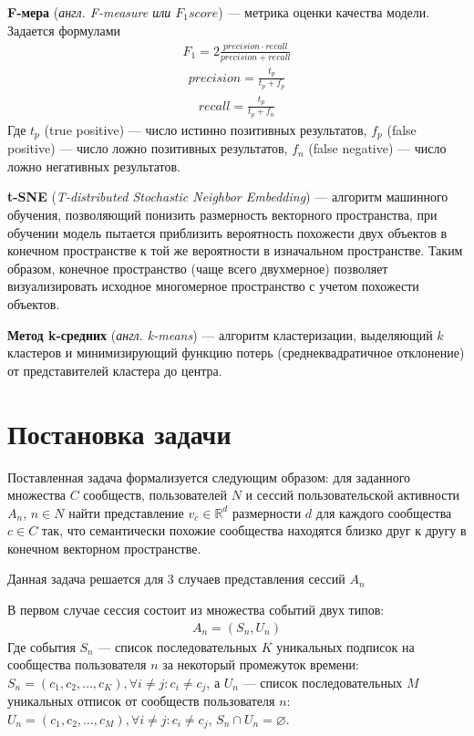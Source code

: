 \documentclass[times,specification,annotation]{itmo-student-thesis}
\begin{document}
\textbf{F-мера} (\textit{англ. F-measure или $F_1 score$}) --- метрика оценки качества модели. Задается формулами
 \begin{align*}
F_1 = 2 \frac{precision \cdot recall}{precision + recall}
\end{align*}
 \begin{align*}
precision = \frac{t_p}{t_p + f_p}
\end{align*}
 \begin{align*}
recall = \frac{t_p}{t_p + f_n}
\end{align*}
Где $t_p$ (true positive) --- число истинно позитивных результатов, $f_p$ (false positive) --- число ложно позитивных результатов, $f_n$ (false negative) --- число ложно негативных результатов.



\textbf{t-SNE} (\textit{T-distributed Stochastic Neighbor Embedding})\cite{maaten2008visualizing} --- алгоритм машинного обучения, позволяющий понизить размерность векторного пространства, при обучении модель пытается приблизить вероятность похожести двух объектов в конечном пространстве к той же вероятности в изначальном пространстве. Таким образом, конечное пространство (чаще всего двухмерное) позволяет визуализировать исходное многомерное пространство с учетом похожести объектов. 

\textbf{Метод k-средних} (\textit{англ. k-means})\cite{lloyd1982least} --- алгоритм кластеризации, выделяющий $k$ кластеров и минимизирующий функцию потерь (среднеквадратичное отклонение) от представителей кластера до центра.  

\section{Постановка задачи}\label{sec:intro}

Поставленная задача формализуется следующим образом: для заданного множества $C$ сообществ, пользователей $N$ и сессий пользовательской активности $A_n$, $n \in N$ найти представление $v_{c} \in \mathbb{R}^d$ размерности $d$ для каждого сообщества $c \in C$ так, что семантически похожие сообщества находятся близко друг к другу в конечном векторном пространстве. 

Данная задача решается для 3 случаев представления сессий $A_n$
 
В первом случае сессия состоит из множества событий двух типов:
 \begin{align}
A_n = (S_n, U_n) 
\label{eq-subs}
\end{align}
Где события $S_n$ --- список последовательных $K$ уникальных подписок на сообщества пользователя $n$ за некоторый промежуток времени: $S_n = (c_{1}, c_{2}, \dots, c_{K}), \forall i \ne j : c_i \ne c_j$, а $U_n$ --- список последовательных $M$ уникальных отписок от сообществ пользователя $n$: $U_n = (c_{1},  c_{2}, \dots, c_{M}), \forall i \ne j : c_i \ne c_j$, $S_n \cap U_n = \varnothing$.
\end{document}
